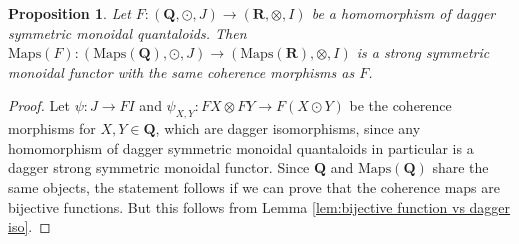 \documentclass[12pt]{tac}
\newtheorem{proposition}[theorem]{Proposition}
\theoremstyle{definition}
\theoremstyle{remark}
\newcommand{\<}{\langle}
\renewcommand{\>}{\rangle}
\renewcommand{\:}{\colon}
\begin{document}
\begin{proposition}\label{prop:Maps_monoidal}
    Let $F:(\mathbf Q,\odot,J)\to (\mathbf R,\otimes,I)$ be a homomorphism of dagger symmetric monoidal quantaloids. Then $ \mathrm{Maps}(F):(\mathrm{Maps}(\mathbf Q),\odot,J)\to(\mathrm{Maps}(\mathbf R),\otimes,I)$ is a strong symmetric monoidal functor with the same coherence morphisms as $F$.   
\end{proposition}
\begin{proof}
Let $\psi:J\to FI$ and $\psi_{X,Y}:FX\otimes FY\to F(X\odot Y)$ be the coherence morphisms for $X,Y\in\mathbf Q$, which are dagger isomorphisms, since any homomorphism of dagger symmetric monoidal quantaloids in particular is a dagger strong symmetric monoidal functor. Since $\mathbf Q$ and $\mathrm{Maps}(\mathbf Q)$ share the same objects, the statement follows if we can prove that the coherence maps are bijective functions. But this follows from Lemma  \ref{lem:bijective function vs dagger iso}.
\end{proof}
\end{document}
